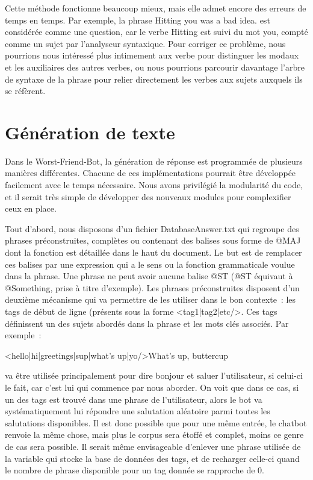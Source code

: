 \documentclass[paper=a4, fontsize=12pt]{article}
\begin{document}
Cette méthode fonctionne beaucoup mieux, mais elle admet encore des erreurs de temps en temps. Par exemple, la phrase \og Hitting you was a bad idea.\fg{} est considérée comme une question, car le verbe \og Hitting\fg{} est suivi du mot \og you\fg{}, compté comme un sujet par l'analyseur syntaxique. Pour corriger ce problème, nous pourrions nous intéressé plus intimement aux verbe pour distinguer les modaux et les auxiliaires des autres verbes, ou nous pourrions parcourir davantage l'arbre de syntaxe de la phrase pour relier directement les verbes aux sujets auxquels ils se réfèrent.
	
\section{Génération de texte}
Dans le Worst-Friend-Bot, la génération de réponse est programmée de plusieurs manières différentes. Chacune de ces implémentations  pourrait être développée facilement avec le temps nécessaire. Nous avons privilégié la modularité du code, et il serait très simple de développer des nouveaux modules pour complexifier ceux en place.


Tout d’abord, nous disposons d’un fichier DatabaseAnswer.txt qui regroupe des phrases préconstruites, complètes ou contenant des balises sous forme de @MAJ dont la fonction est détaillée dans le haut du document. Le but est de remplacer ces balises par une expression qui a le sens ou la fonction grammaticale voulue dans la phrase. Une phrase ne peut avoir aucune balise @ST (@ST équivaut à @Something, prise à titre d’exemple). Les phrases préconstruites disposent d’un deuxième mécanisme qui va permettre de les utiliser dans le bon contexte : les tags de début de ligne (présents sous la forme \textless tag1|tag2|etc/\textgreater. Ces tags définissent un des sujets abordés dans la phrase et les mots clés associés. Par exemple :
\begin{center}
\textless hello|hi|greetings|sup|what's up|yo/\textgreater What's up, buttercup
\end{center}
va être utilisée principalement pour dire bonjour et saluer l’utilisateur, si celui-ci le fait, car c’est lui qui commence par nous aborder. On voit que dans ce cas, si un des tags est trouvé dans une phrase de l’utilisateur, alors le bot va systématiquement lui répondre une salutation aléatoire parmi toutes les salutations disponibles. Il est donc possible que pour une même entrée, le chatbot renvoie la même chose, mais plus le corpus sera étoffé et complet, moins ce genre de cas sera possible. Il serait même envisageable d’enlever une phrase utilisée de la variable qui stocke la base de données des tags, et de recharger celle-ci quand le nombre de phrase disponible pour un tag donnée se rapproche de 0.
\end{document}
